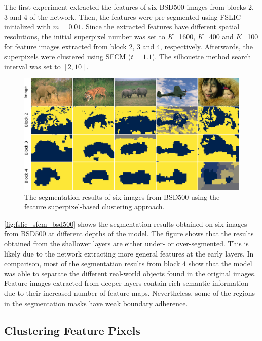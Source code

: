 The first experiment extracted the features of six BSD500 images from blocks 2, 3 and 4 of the network. Then, the features were pre-segmented using FSLIC initialized with $m=0.01$. Since the extracted features have different spatial resolutions, the initial superpixel number was set to $K$=1600, $K$=400 and $K$=100 for feature images extracted from block 2, 3 and 4, respectively. Afterwards, the superpixels were clustered using SFCM ($t=1.1$). The silhouette method search interval was set to $[2, 10]$.

\begin{figure}[ht]
    \centering
    \includegraphics[width=\textwidth]{figures/fslic_sfcm_bsd500.pdf}
    \caption{The segmentation results of six images from BSD500 using the feature superpixel-based clustering approach.}
    \label{fig:fslic_sfcm_bsd500}
\end{figure}

\autoref{fig:fslic_sfcm_bsd500} shows the segmentation results obtained on six images from BSD500 at different depths of the model. The figure shows that the results obtained from the shallower layers are either under- or over-segmented. This is likely due to the network extracting more general features at the early layers. In comparison, most of the segmentation results from block 4 show that the model was able to separate the different real-world objects found in the original images. Feature images extracted from deeper layers contain rich semantic information due to their increased number of feature maps. Nevertheless, some of the regions in the segmentation masks have weak boundary adherence.


\subsection{Clustering Feature Pixels}

